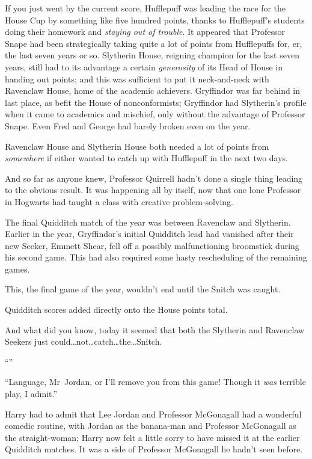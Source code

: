 If you just went by the current score, Hufflepuff was leading the race for the House Cup by something like five hundred points, thanks to Hufflepuff’s students doing their homework and \emph{staying out of trouble}. It appeared that Professor Snape had been strategically taking quite a lot of points from Hufflepuffs for, er, the last seven years or so. Slytherin House, reigning champion for the last seven years, still had to its advantage a certain \emph{generosity} of its Head of House in handing out points; and this was sufficient to put it neck-and-neck with Ravenclaw House, home of the academic achievers. Gryffindor was far behind in last place, as befit the House of nonconformists; Gryffindor had Slytherin’s profile when it came to academics and mischief, only without the advantage of Professor Snape. Even Fred and George had barely broken even on the year.

Ravenclaw House and Slytherin House both needed a lot of points from \emph{somewhere} if either wanted to catch up with Hufflepuff in the next two days.

And so far as anyone knew, Professor Quirrell hadn’t done a single thing leading to the obvious result. It was happening all by itself, now that one lone Professor in Hogwarts had taught a class with creative problem-solving.

The final Quidditch match of the year was between Ravenclaw and Slytherin. Earlier in the year, Gryffindor’s initial Quidditch lead had vanished after their new Seeker, Emmett Shear, fell off a possibly malfunctioning broomstick during his second game. This had also required some hasty rescheduling of the remaining games.

This, the final game of the year, wouldn’t end until the Snitch was caught.

Quidditch scores added directly onto the House points total.

And what did you know, today it seemed that both the Slytherin and Ravenclaw Seekers just could…not…catch…the…Snitch.

“”

“Language, Mr~Jordan, or I’ll remove you from this game! Though it \emph{was} terrible play, I admit.”

Harry had to admit that Lee Jordan and Professor McGonagall had a wonderful comedic routine, with Jordan as the banana-man and Professor McGonagall as the straight-woman; Harry now felt a little sorry to have missed it at the earlier Quidditch matches. It was a side of Professor McGonagall he hadn’t seen before.

